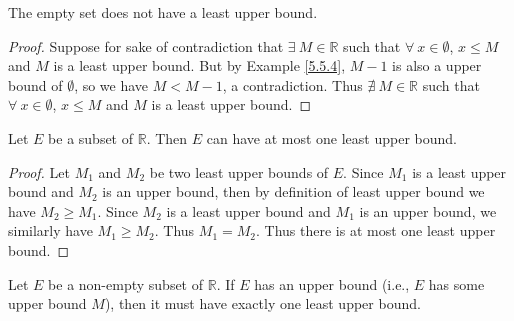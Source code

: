 \begin{additional corollary}\label{ac 5.5.2}
The empty set does not have a least upper bound.
\end{additional corollary}

\begin{proof}
Suppose for sake of contradiction that \(\exists\ M \in \mathds{R}\) such that \(\forall\ x \in \emptyset\), \(x \leq M\) and \(M\) is a least upper bound.
But by Example \ref{5.5.4}, \(M - 1\) is also a upper bound of \(\emptyset\), so we have \(M < M - 1\), a contradiction.
Thus \(\nexists\ M \in \mathds{R}\) such that \(\forall\ x \in \emptyset\), \(x \leq M\) and \(M\) is a least upper bound.
\end{proof}

\setcounter{theorem}{7}
\begin{proposition}\label{5.5.8}
Let \(E\) be a subset of \(\mathds{R}\).
Then \(E\) can have at most one least upper bound.
\end{proposition}

\begin{proof}
Let \(M_1\) and \(M_2\) be two least upper bounds of \(E\).
Since \(M_1\) is a least upper bound and \(M_2\) is an upper bound, then by definition of least upper bound we have \(M_2 \geq M_1\).
Since \(M_2\) is a least upper bound and \(M_1\) is an upper bound, we similarly have \(M_1 \geq M_2\).
Thus \(M_1 = M_2\).
Thus there is at most one least upper bound.
\end{proof}

\begin{theorem}\label{5.5.9}
Let \(E\) be a non-empty subset of \(\mathds{R}\).
If \(E\) has an upper bound (i.e., \(E\) has some upper bound \(M\)), then it must have exactly one least upper bound.
\end{theorem}

